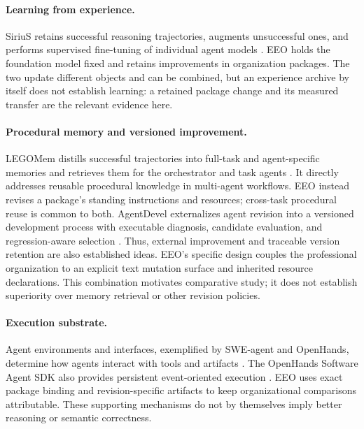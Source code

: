 \paragraph{Learning from experience.}
SiriuS retains successful reasoning trajectories, augments unsuccessful ones, and performs supervised fine-tuning of individual agent models \citep{sirius}. EEO holds the foundation model fixed and retains improvements in organization packages. The two update different objects and can be combined, but an experience archive by itself does not establish learning: a retained package change and its measured transfer are the relevant evidence here.

\paragraph{Procedural memory and versioned improvement.}
LEGOMem distills successful trajectories into full-task and agent-specific memories and retrieves them for the orchestrator and task agents \citep{legomem}. It directly addresses reusable procedural knowledge in multi-agent workflows. EEO instead revises a package's standing instructions and resources; cross-task procedural reuse is common to both. AgentDevel externalizes agent revision into a versioned development process with executable diagnosis, candidate evaluation, and regression-aware selection \citep{agentdevel}. Thus, external improvement and traceable version retention are also established ideas. EEO's specific design couples the professional organization to an explicit text mutation surface and inherited resource declarations. This combination motivates comparative study; it does not establish superiority over memory retrieval or other revision policies.

\paragraph{Execution substrate.}
Agent environments and interfaces, exemplified by SWE-agent and OpenHands, determine how agents interact with tools and artifacts \citep{sweagent,openhands}. The OpenHands Software Agent SDK also provides persistent event-oriented execution \citep{ohsdk}. EEO uses exact package binding and revision-specific artifacts to keep organizational comparisons attributable. These supporting mechanisms do not by themselves imply better reasoning or semantic correctness.

